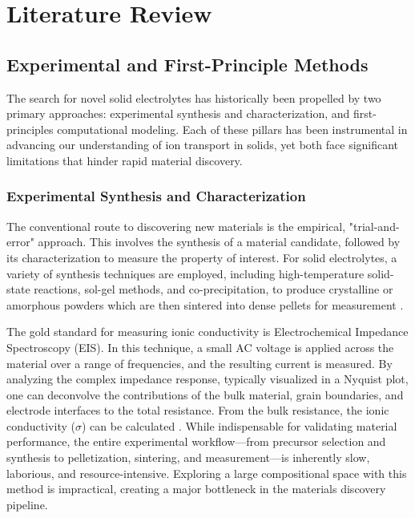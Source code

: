 \chapter{Literature Review}

\section{Experimental and First-Principle Methods}

The search for novel solid electrolytes has historically been propelled by two primary approaches: experimental synthesis and characterization, and first-principles computational modeling. Each of these pillars has been instrumental in advancing our understanding of ion transport in solids, yet both face significant limitations that hinder rapid material discovery.

\subsection{Experimental Synthesis and Characterization}

The conventional route to discovering new materials is the empirical, "trial-and-error" approach. This involves the synthesis of a material candidate, followed by its characterization to measure the property of interest. For solid electrolytes, a variety of synthesis techniques are employed, including high-temperature solid-state reactions, sol-gel methods, and co-precipitation, to produce crystalline or amorphous powders which are then sintered into dense pellets for measurement \cite{Goodenough2018}.

The gold standard for measuring ionic conductivity is Electrochemical Impedance Spectroscopy (EIS). In this technique, a small AC voltage is applied across the material over a range of frequencies, and the resulting current is measured. By analyzing the complex impedance response, typically visualized in a Nyquist plot, one can deconvolve the contributions of the bulk material, grain boundaries, and electrode interfaces to the total resistance. From the bulk resistance, the ionic conductivity (\(\sigma\)) can be calculated \cite{Irvine1990}. While indispensable for validating material performance, the entire experimental workflow—from precursor selection and synthesis to pelletization, sintering, and measurement—is inherently slow, laborious, and resource-intensive. Exploring a large compositional space with this method is impractical, creating a major bottleneck in the materials discovery pipeline.

